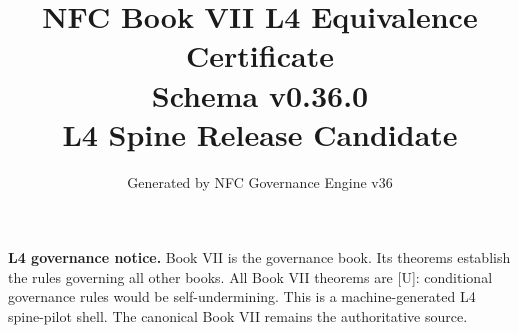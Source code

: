 \documentclass[11pt]{article}
\title{NFC Book VII L4 Equivalence Certificate\\[1ex]\large Schema v0.36.0\\[0.5ex]\normalsize L4 Spine Release Candidate}
\author{Generated by NFC Governance Engine v36}
\date{}
\begin{document}
\maketitle
\tableofcontents
\bigskip
\noindent\textbf{L4 governance notice.} Book VII is the governance book.
Its theorems establish the rules governing all other books.
All Book VII theorems are [U]: conditional governance rules would be self-undermining.
This is a machine-generated L4 spine-pilot shell.
The canonical Book VII remains the authoritative source.
\vspace{1em}

\end{document}
